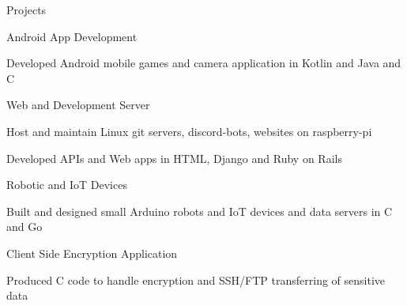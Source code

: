 \documentclass{resume} %
\begin{document}






%



\begin{rSection}{Projects}

\begin{rSubsection}{Android App Development}{}{}{}
\item Developed Android mobile games and camera application in Kotlin and Java and C
\end{rSubsection}

\begin{rSubsection}{Web and Development Server}{}{}{}
\item Host and maintain Linux git servers, discord-bots, websites on raspberry-pi
\item Developed APIs and Web apps in HTML, Django and Ruby on Rails
\end{rSubsection}

\begin{rSubsection}{Robotic and IoT Devices}{}{}{}
\item Built and designed small Arduino robots and IoT devices and data servers in C and Go
\end{rSubsection}

\begin{rSubsection}{Client Side Encryption Application}{}{}{}
\item Produced C code to handle encryption and SSH/FTP transferring of sensitive data
\end{rSubsection}
\end{rSection}
\end{document}
